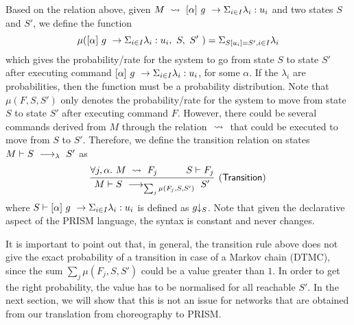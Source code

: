 Based on the relation above, given
$M\ \stackrel{}{\rightsquigarrow}\ [\alpha]\ g\ \rightarrow \Sigma_{i\in I}\lambda_i: u_i$ and two
states $S$ and $S'$, we define the function
$$\mu([\alpha]\ g\ \rightarrow \Sigma_{i\in I}\lambda_i: u_i,\ S,\ S'\ ) = \Sigma_{S[u_i]=S',i\in I}\lambda_i$$
which gives the probability/rate for the system to go from state $S$
to state $S'$ after executing command $[\alpha]\ g\ \rightarrow \Sigma_{i\in I}\lambda_i: u_i$,
for some $\alpha$.
%
If the $\lambda_i$ are probabilities, then the function must be a
probability distribution. Note that $\mu(F,S,S')$ only denotes the
probability/rate for the system to move from state $S$ to state $S'$
after executing command $F$. However, there could be several commands
derived from $M$ through the relation $\ \stackrel{}{\rightsquigarrow}\ $ that could be
executed to move from $S$ to $S'$. Therefore, we define the transition
relation on states $M\vdash S\ \longrightarrow_{\lambda}\ S'$ as
$$
\infer[\mathsf{(Transition)}]
{
  M\vdash S\red{\sum_{j} \mu(F_j,S,S')}S'
}
{
  \forall j,\alpha.\ M\prismred{}F_j
  \quad&\quad
  S\vdash F_j
}
$$
where $S\vdash [\alpha]\ g\ \rightarrow \Sigma_{i\in I}\lambda_i: u_i$ is defined as $g\!\!\downarrow_{S}$.
Note that given the declarative aspect of the PRISM language, the
syntax is constant and never changes.

It is important to point out that, in general, the transition rule
above does not give the exact probability of a transition in case of a
Markov chain (DTMC), since the sum ${\sum_{j} \mu(F_j,S,S')}$ could be
a value greater than $1$. In order to get the right probability, the
value has to be normalised for all reachable $S'$. In the next
section, we will show that this is not an issue for networks that are
obtained from our translation from choreography to PRISM.


